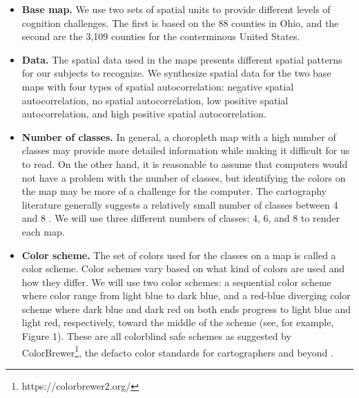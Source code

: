 
\begin{itemize}
    \item {\bf Base map.} We use two sets of spatial units to provide different levels of cognition challenges. The first is based on the 88 counties in Ohio, and the second are the 3,109 counties for the conterminous United States.

    \item {\bf Data.} The spatial data used in the maps presents different spatial patterns for our subjects to recognize. We synthesize spatial data for the two base maps with four types of spatial autocorrelation: negative spatial autocorrelation, no spatial autocorrelation, low positive spatial autocorrelation, and high positive spatial autocorrelation.

    \item {\bf Number of classes.} In general, a choropleth map with a high number of classes may provide more detailed information while making it difficult for us to read. On the other hand, it is reasonable to assume that computers would not have a problem with the number of classes, but identifying the colors on the map may be more of a challenge for the computer. The cartography literature generally suggests a relatively small number of classes between 4 and 8 \citep{Den96}. We will use three different numbers of classes: 4, 6, and 8 to render each map.

    \item {\bf Color scheme.} The set of colors used for the classes on a map is called a color scheme. Color schemes vary based on what kind of colors are used and how they differ. We will use two color schemes: a sequential color scheme where color range from light blue to dark blue, and a red-blue diverging color scheme where dark blue and dark red on both ends progress to light blue and light red, respectively, toward the middle of the scheme (see, for example, Figure 1). These are all colorblind safe schemes as suggested by ColorBrewer\footnote{https://colorbrewer2.org/}, the defacto color standards for cartographers and beyond \citep{harrower2003colorbrewer}.
\end{itemize}

